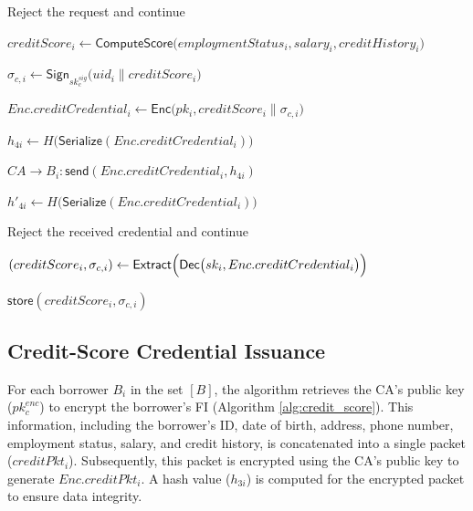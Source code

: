 \documentclass[a4paper,fleqn]{cas-dc}
\begin{document}
\begin{algorithm*}[t]
\begin{algorithmic}[1]
        \State Reject the request and continue
    \EndIf

    \State $creditScore_i
    \leftarrow
    \mathsf{ComputeScore}
    \bigl(
    employmentStatus_i,
    salary_i,
    creditHistory_i
    \bigr)$

    \State $\sigma_{c,i}
    \leftarrow
    \mathsf{Sign}_{sk_c^{sig}}
    \bigl(
    uid_i\parallel creditScore_i
    \bigr)$

    \State $Enc.creditCredential_i
    \leftarrow
    \mathsf{Enc}
    \bigl(
    pk_i,
    creditScore_i\parallel\sigma_{c,i}
    \bigr)$

    \State $h_{4i}
    \leftarrow
    H\bigl(
    \mathsf{Serialize}(Enc.creditCredential_i)
    \bigr)$

    \State $CA\rightarrow B_i:
    \mathsf{send}
    (Enc.creditCredential_i,h_{4i})$

    \State $h'_{4i}
    \leftarrow
    H\bigl(
    \mathsf{Serialize}(Enc.creditCredential_i)
    \bigr)$

        \State Reject the received credential and continue
    \EndIf

    \State $(creditScore_i,\sigma_{c,i})
    \leftarrow
    \mathsf{Extract}\Bigl(
    \mathsf{Dec}
    \bigl(
    sk_i,
    Enc.creditCredential_i
    \bigr)
    \Bigr)$

    \State $\mathsf{store}
    (creditScore_i,\sigma_{c,i})$

\EndFor

\end{algorithmic}
\end{algorithm*}



\subsection{Credit-Score Credential Issuance}

For each borrower $B_i$ in the set $[B]$, the algorithm retrieves the CA's public key ($pk_c^{enc}$) to encrypt the borrower's FI (Algorithm \ref{alg:credit_score}). This information, including the borrower's ID, date of birth, address, phone number, employment status, salary, and credit history, is concatenated into a single packet ($creditPkt_i$). Subsequently, this packet is encrypted using the CA's public key to generate $Enc.creditPkt_i$. A hash value ($h_{3i}$) is computed for the encrypted packet to ensure data integrity.
\end{document}
